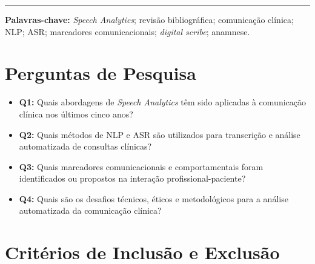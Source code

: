 \documentclass[12pt, a4paper]{article}
\begin{document}
\begin{abstract}
\textbf{Conclusões:}
Confirma-se uma lacuna consistente: poucos estudos operacionalizam interações
clínicas como variáveis mensuráveis derivadas da fala, especialmente marcadores
comunicacionais e comportamentais extraídos da anamnese. Esta revisão
fundamenta a necessidade de estudos que integrem \textit{Speech Analytics} à
análise estruturada da comunicação clínica como fonte de dados para
monitoramento de adesão e qualidade do cuidado.

\end{abstract}

\bigskip
\hrule
\bigskip

\noindent\textbf{Palavras-chave:}
\textit{Speech Analytics};
revisão bibliográfica;
comunicação clínica;
NLP;
ASR;
marcadores comunicacionais;
\textit{digital scribe};
anamnese.

\section{Perguntas de Pesquisa}

\begin{itemize}
  \item \textbf{Q1:} Quais abordagens de \textit{Speech Analytics} têm sido
        aplicadas à comunicação clínica nos últimos cinco anos?
  \item \textbf{Q2:} Quais métodos de NLP e ASR são utilizados para transcrição
        e análise automatizada de consultas clínicas?
  \item \textbf{Q3:} Quais marcadores comunicacionais e comportamentais foram
        identificados ou propostos na interação profissional-paciente?
  \item \textbf{Q4:} Quais são os desafios técnicos, éticos e metodológicos
        para a análise automatizada da comunicação clínica?
\end{itemize}

\section{Critérios de Inclusão e Exclusão}
\end{document}
